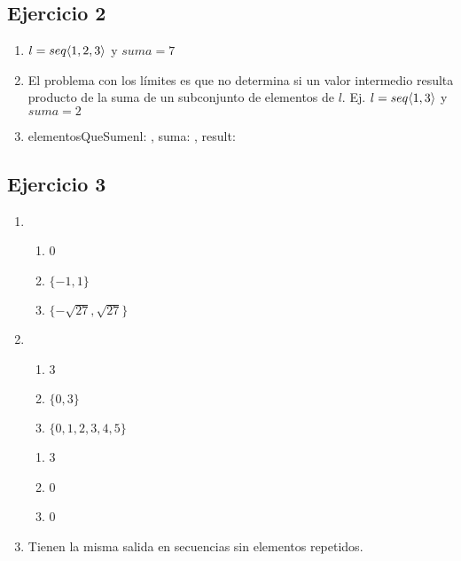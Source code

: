 \subsection{Ejercicio 2}
\begin{enumerate}[label=(\alph*)]
    \item $l = seq \langle 1,2,3\rangle$ y $suma = 7$
    \item El problema con los límites es que no determina si un valor intermedio resulta producto de la suma de
    un subconjunto de elementos de $l$. Ej. $l = seq \langle 1,3\rangle$ y $suma = 2$
    \item 
    	\begin{proc}{elementosQueSumen}{\In l: \TLista{\ent}, \In suma: \ent, \Out result: \TLista{\ent}}{}
    	\end{proc}
    
\end{enumerate}

\subsection{Ejercicio 3}
\begin{enumerate}[label=(\alph*)]
    \item \begin{enumerate}
        \item 0
        \item $\{-1,1\}$
        \item $\{-\sqrt{27},\sqrt{27}\}$
    \end{enumerate}
    \item \begin{enumerate}
        \item 3
        \item $\{0,3\}$
        \item $\{0,1,2,3,4,5\}$
    \end{enumerate}
    \begin{enumerate}
        \item 3
        \item 0
        \item 0
    \end{enumerate}
    \item Tienen la misma salida en secuencias sin elementos repetidos.
\end{enumerate}

